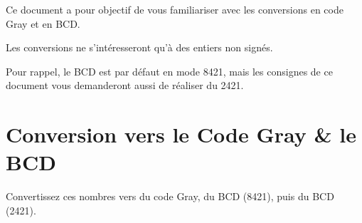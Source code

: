\documentclass[11pt,a4paper]{article}
\begin{document}
\EncadreTitre

\bigskip


%
%

\bigskip


Ce document a pour objectif de vous familiariser avec les conversions en code Gray et en BCD.

\bigskip

Les conversions ne s'intéresseront qu'à des entiers non signés.

Pour rappel, le BCD est par défaut en mode 8421, mais les consignes de ce document vous demanderont aussi de réaliser du 2421.

\bigskip


\section{Conversion vers le Code Gray \& le BCD}


\medskip

Convertissez ces nombres vers du code Gray, du BCD (8421), puis du BCD (2421).

\medskip
\end{document}

